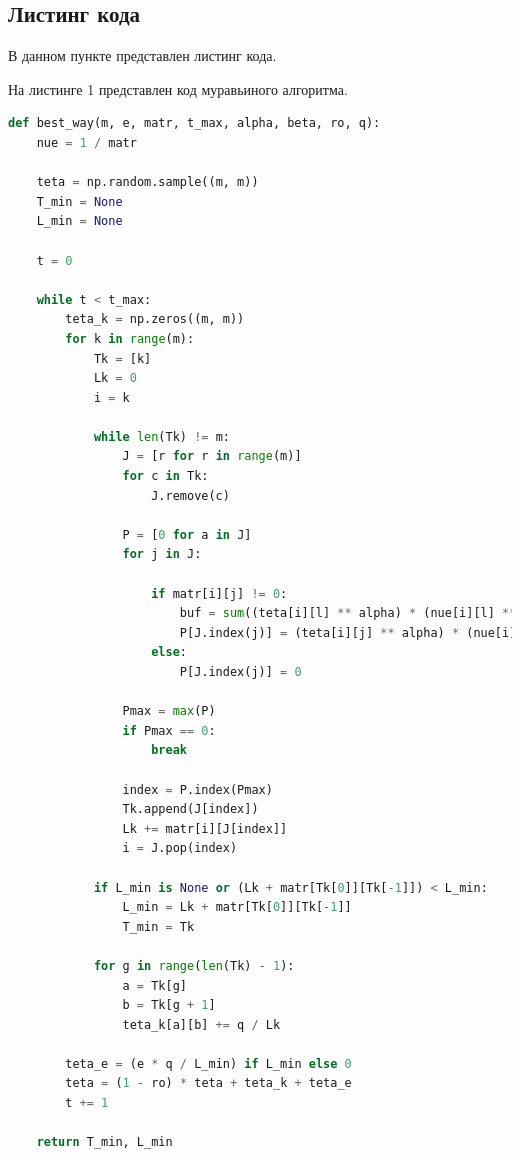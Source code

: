 \documentclass[a4paper, 12pt]{article}
\begin{document}
	\subsection{Листинг кода}
	В данном пункте представлен листинг кода.


	\lstset{style=mystyle}

	\hspace*{-7mm} На листинге 1 представлен код муравьиного алгоритма.
	\begin{lstlisting}[language=Python, caption = Муравьиный алгоритм]
def best_way(m, e, matr, t_max, alpha, beta, ro, q):
	nue = 1 / matr  
	
	teta = np.random.sample((m, m))  
	T_min = None  
	L_min = None   
	
	t = 0  
	
	while t < t_max:
		teta_k = np.zeros((m, m)) 
		for k in range(m):  
			Tk = [k] 
			Lk = 0 
			i = k   
	
			while len(Tk) != m:
				J = [r for r in range(m)]  
				for c in Tk: 
					J.remove(c)
	
				P = [0 for a in J]  
				for j in J:
	
					if matr[i][j] != 0: 
						buf = sum((teta[i][l] ** alpha) * (nue[i][l] ** beta) for l in J)
						P[J.index(j)] = (teta[i][j] ** alpha) * (nue[i][j] ** beta) / buf
					else:
						P[J.index(j)] = 0
	
				Pmax = max(P)
				if Pmax == 0:
					break
	
				index = P.index(Pmax) 
				Tk.append(J[index])   
				Lk += matr[i][J[index]]  
				i = J.pop(index)  
	
			if L_min is None or (Lk + matr[Tk[0]][Tk[-1]]) < L_min: 
				L_min = Lk + matr[Tk[0]][Tk[-1]]                   
				T_min = Tk
	
			for g in range(len(Tk) - 1):  
				a = Tk[g]
				b = Tk[g + 1]
				teta_k[a][b] += q / Lk
	
		teta_e = (e * q / L_min) if L_min else 0   
		teta = (1 - ro) * teta + teta_k + teta_e     
		t += 1
	
	return T_min, L_min
	\end{lstlisting}
	
\end{document}
